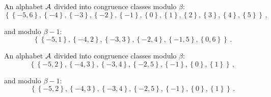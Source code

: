 


\begin{exmp}
\label{ex:integerAB}

An alphabet $\mathcal{A}$ divided into congruence classes modulo $\beta$: 
$$ \left\{\left\{-5, 6\right\}, \left\{-4\right\}, \left\{-3\right\}, \left\{-2\right\}, \left\{-1\right\}, \left\{0\right\}, \left\{1\right\}, \left\{2\right\}, \left\{3\right\}, \left\{4\right\}, \left\{5\right\}\right\} \,,$$

and modulo $\beta - 1$: $$ \left\{\left\{-5, 1\right\}, \left\{-4, 2\right\}, \left\{-3, 3\right\}, \left\{-2, 4\right\}, \left\{-1, 5\right\}, \left\{0, 6\right\}\right\} \,.$$

\end{exmp}




%
%
%
%


\begin{exmp}
\label{ex:integerAE}

An alphabet $\mathcal{A}$ divided into congruence classes modulo $\beta$: 
$$ \left\{\left\{-5, 2\right\}, \left\{-4, 3\right\}, \left\{-3, 4\right\}, \left\{-2, 5\right\}, \left\{-1\right\}, \left\{0\right\}, \left\{1\right\}\right\} \,,$$

and modulo $\beta - 1$: $$ \left\{\left\{-5, 2\right\}, \left\{-4, 3\right\}, \left\{-3, 4\right\}, \left\{-2, 5\right\}, \left\{-1\right\}, \left\{0\right\}, \left\{1\right\}\right\} \,.$$

\end{exmp}




%
%
%
%
%
%
%
%




